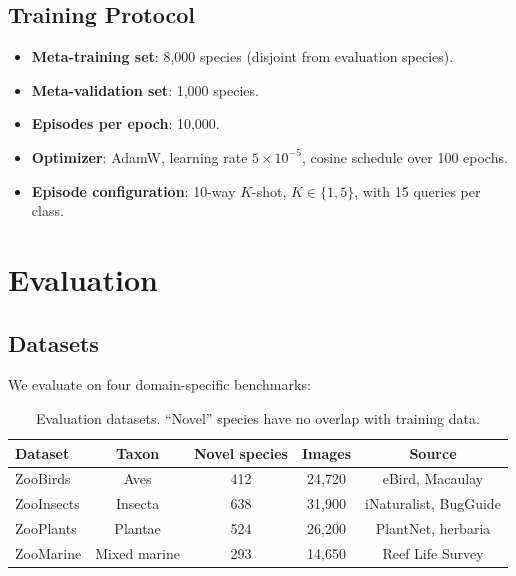 \documentclass[11pt,a4paper]{article}
\begin{document}
\subsection{Training Protocol}

\begin{itemize}
  \item \textbf{Meta-training set}: 8{,}000 species (disjoint from
    evaluation species).
  \item \textbf{Meta-validation set}: 1{,}000 species.
  \item \textbf{Episodes per epoch}: 10{,}000.
  \item \textbf{Optimizer}: AdamW, learning rate $5 \times 10^{-5}$,
    cosine schedule over 100 epochs.
  \item \textbf{Episode configuration}: 10-way $K$-shot, $K \in
    \{1, 5\}$, with 15 queries per class.
\end{itemize}


\section{Evaluation}
\label{sec:evaluation}

\subsection{Datasets}

We evaluate on four domain-specific benchmarks:

\begin{table}[H]
\centering
\caption{Evaluation datasets. ``Novel'' species have no overlap with
training data.}
\label{tab:datasets}
\begin{tabular}{lcccc}
\toprule
\textbf{Dataset} & \textbf{Taxon} & \textbf{Novel species} &
  \textbf{Images} & \textbf{Source} \\
\midrule
ZooBirds & Aves & 412 & 24{,}720 & eBird, Macaulay \\
ZooInsects & Insecta & 638 & 31{,}900 & iNaturalist, BugGuide \\
ZooPlants & Plantae & 524 & 26{,}200 & PlantNet, herbaria \\
ZooMarine & Mixed marine & 293 & 14{,}650 & Reef Life Survey \\
\bottomrule
\end{tabular}
\end{table}
\end{document}
